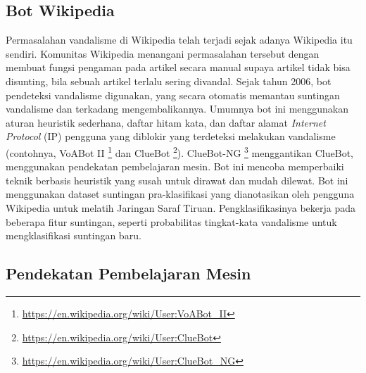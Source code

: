 \label{subsec:bot-wikipedia}
\subsection{Bot Wikipedia}

Permasalahan vandalisme di Wikipedia telah terjadi sejak adanya Wikipedia itu
sendiri.
Komunitas Wikipedia menangani permasalahan tersebut dengan membuat fungsi
pengaman pada artikel secara manual supaya artikel tidak bisa disunting, bila
sebuah artikel terlalu sering divandal.
Sejak tahun 2006, bot pendeteksi vandalisme digunakan, yang secara otomatis
memantau suntingan vandalisme dan terkadang mengembalikannya.
Umumnya bot ini menggunakan aturan heuristik sederhana, daftar hitam kata, dan
daftar alamat \textit{Internet Protocol} (IP) pengguna yang
diblokir yang terdeteksi melakukan vandalisme (contohnya, VoABot II
\footnote{\url{https://en.wikipedia.org/wiki/User:VoABot_II}}
dan ClueBot
\footnote{\url{https://en.wikipedia.org/wiki/User:ClueBot}}).
ClueBot-NG
\footnote{\url{https://en.wikipedia.org/wiki/User:ClueBot_NG}}
menggantikan ClueBot, menggunakan pendekatan pembelajaran mesin.
Bot ini mencoba memperbaiki teknik berbasis heuristik yang susah untuk dirawat
dan mudah dilewat.
Bot ini menggunakan dataset suntingan pra-klasifikasi yang dianotasikan oleh
pengguna Wikipedia untuk melatih Jaringan Saraf Tiruan.
Pengklasifikasinya bekerja pada beberapa fitur suntingan, seperti probabilitas
tingkat-kata vandalisme untuk mengklasifikasi suntingan baru.

\label{subsec:pendekatan-pembelajaran-mesin}
\subsection{Pendekatan Pembelajaran Mesin}

